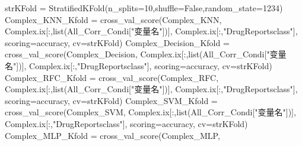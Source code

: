 \documentclass[
]{article}
\newenvironment{Shaded}{}{}
\newcommand{\BuiltInTok}[1]{#1}
\newcommand{\DecValTok}[1]{\textcolor[rgb]{0.25,0.63,0.44}{#1}}
\newcommand{\NormalTok}[1]{#1}
\newcommand{\OperatorTok}[1]{\textcolor[rgb]{0.40,0.40,0.40}{#1}}
\newcommand{\StringTok}[1]{\textcolor[rgb]{0.25,0.44,0.63}{#1}}
\newcommand{\VariableTok}[1]{\textcolor[rgb]{0.10,0.09,0.49}{#1}}
\begin{document}
\begin{Shaded}
\begin{Highlighting}[]
\NormalTok{strKFold }\OperatorTok{=}\NormalTok{ StratifiedKFold(n\_splits}\OperatorTok{=}\DecValTok{10}\NormalTok{,shuffle}\OperatorTok{=}\VariableTok{False}\NormalTok{,random\_state}\OperatorTok{=}\DecValTok{1234}\NormalTok{)}
\NormalTok{Complex\_KNN\_Kfold }\OperatorTok{=}\NormalTok{ cross\_val\_score(Complex\_KNN,}
\NormalTok{                            Complex.ix[:,}\BuiltInTok{list}\NormalTok{(All\_Corr\_Condi[}\StringTok{"变量名"}\NormalTok{])],}
\NormalTok{                            Complex.ix[:,}\StringTok{"DrugReportsclass"}\NormalTok{],}
\NormalTok{                            scoring}\OperatorTok{=}\StringTok{\textquotesingle{}accuracy\textquotesingle{}}\NormalTok{,}
\NormalTok{                            cv}\OperatorTok{=}\NormalTok{strKFold)}
\NormalTok{Complex\_Decision\_Kfold }\OperatorTok{=}\NormalTok{ cross\_val\_score(Complex\_Decision,}
\NormalTok{                            Complex.ix[:,}\BuiltInTok{list}\NormalTok{(All\_Corr\_Condi[}\StringTok{"变量名"}\NormalTok{])],}
\NormalTok{                            Complex.ix[:,}\StringTok{"DrugReportsclass"}\NormalTok{],}
\NormalTok{                            scoring}\OperatorTok{=}\StringTok{\textquotesingle{}accuracy\textquotesingle{}}\NormalTok{,}
\NormalTok{                            cv}\OperatorTok{=}\NormalTok{strKFold)}
\NormalTok{Complex\_RFC\_Kfold }\OperatorTok{=}\NormalTok{ cross\_val\_score(Complex\_RFC,}
\NormalTok{                            Complex.ix[:,}\BuiltInTok{list}\NormalTok{(All\_Corr\_Condi[}\StringTok{"变量名"}\NormalTok{])],}
\NormalTok{                            Complex.ix[:,}\StringTok{"DrugReportsclass"}\NormalTok{],}
\NormalTok{                            scoring}\OperatorTok{=}\StringTok{\textquotesingle{}accuracy\textquotesingle{}}\NormalTok{,}
\NormalTok{                            cv}\OperatorTok{=}\NormalTok{strKFold)}
\NormalTok{Complex\_SVM\_Kfold }\OperatorTok{=}\NormalTok{ cross\_val\_score(Complex\_SVM,}
\NormalTok{                            Complex.ix[:,}\BuiltInTok{list}\NormalTok{(All\_Corr\_Condi[}\StringTok{"变量名"}\NormalTok{])],}
\NormalTok{                            Complex.ix[:,}\StringTok{"DrugReportsclass"}\NormalTok{],}
\NormalTok{                            scoring}\OperatorTok{=}\StringTok{\textquotesingle{}accuracy\textquotesingle{}}\NormalTok{,}
\NormalTok{                            cv}\OperatorTok{=}\NormalTok{strKFold)}
\NormalTok{Complex\_MLP\_Kfold }\OperatorTok{=}\NormalTok{ cross\_val\_score(Complex\_MLP,}

\end{Highlighting}
\end{Shaded}
\end{document}

